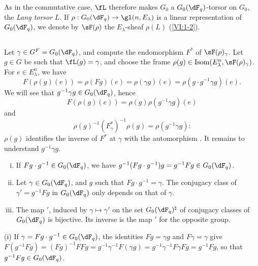 As in the commutative case, $\fL$ therefore makes $G_0$ a $G_0(\dF_q)$-torsor 
on $G_0$, the \emph{Lang torsor} $L$. If 
$\rho:G_0(\dF_q) \to \gl(n,E_\lambda)$ is a linear representation of 
$G_0(\dF_q)$, we denote by $\sF(\rho)$ the $E_\lambda$-sheaf $\rho(L)$ 
(\ref{VI:1-2}). 





\subsection{}\label{VI:1-23}

Let $\gamma\in G^F=G_0(\dF_q)$, and compute the endomorphism $F^\ast$ of 
$\sF(\rho)_\gamma$. Let $g\in G$ be such that $\fL(g)=\gamma$, and choose the frame 
$\rho(g)\in \operatorname{Isom}(E_\lambda^n,\sF(\rho)_\gamma)$. For 
$e\in E_\lambda^n$, we have 
\[
  F(\rho(g)(e)) = \rho(F g)(e) = \rho(\gamma g)(e) = \rho(g\cdot g^{-1}\gamma g)(e) \text{.}
\]
We will see that $g^{-1} \gamma g\in G_0(\dF_q)$, hence 
\[
  F(\rho(g)(e)) = \rho(g) \rho(g^{-1}\gamma g)(e)
\]
and 
\begin{equation*}\tag{1.23.1}\label{VI:eq:1-23-1}
  \rho(g)^{-1} (F_\gamma^\ast)^{-1} \rho(g) = \rho(g^{-1} \gamma g) \text{:}
\end{equation*}
$\rho(g)$ identifies the inverse of $F^\ast$ at $\gamma$ with the automorphism 
. It remains to understand 
$g^{-1} \gamma g$.

\begin{lemma_}\label{VI:1-24}
\begin{enumerate}[(i)]
  \item If $F g\cdot g^{-1} \in G_0(\dF_q)$, we have 
    $g^{-1} (F g\cdot g^{-1}) g = g^{-1} F g\in G_0(\dF_q)$.
  \item Let $\gamma\in G_0(\dF_q)$, and $g$ such that 
    $F g\cdot g^{-1} = \gamma$. The conjugacy class of $\gamma'=g^{-1} Fg$ 
    in $G_0(\dF_q)$ only depends on that of $\gamma$. 
  \item The map $\prime$, induced by $\gamma\mapsto \gamma'$ on the set 
    $G_0(\dF_q)^\natural$ of conjugacy classes of $G_0(\dF_q)$ 
    is bijective. Its inverse is the map $\prime$ for the opposite 
    group. 
\end{enumerate}
\end{lemma_}

(i) If $\gamma= F g\cdot g^{-1}\in G_0(\dF_q)$, the identities $F g=\gamma g$ 
and 
$F\gamma=\gamma$ give $F(g^{-1} F g) = (F g)^{-1} F F g = g^{-1} \gamma^{-1} F(\gamma g) = g^{-1} \gamma^{-1} F \gamma F g = g^{-1} F g$, 
so that $g^{-1} F g \in G_0(\dF_q)$. 


